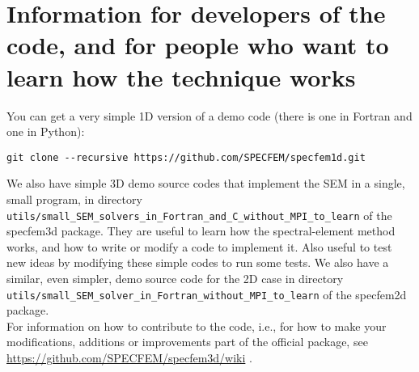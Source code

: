 
\chapter{Information for developers of the code, and for people who want to learn how the technique works}\label{cha:developers}


You can get a very simple 1D version of a demo code (there is one in Fortran and one in Python):
\begin{verbatim}
git clone --recursive https://github.com/SPECFEM/specfem1d.git
\end{verbatim}

\noindent We also have simple 3D demo source codes that implement the SEM in a single, small program, in directory\\
\texttt{utils/small\_SEM\_solvers\_in\_Fortran\_and\_C\_without\_MPI\_to\_learn} of the specfem3d package.
They are useful to learn how the spectral-element method works, and how to write or modify a code to implement it.
Also useful to test new ideas by modifying these simple codes to run some tests.
We also have a similar, even simpler, demo source code for the 2D case in directory\\
\texttt{utils/small\_SEM\_solver\_in\_Fortran\_without\_MPI\_to\_learn} of the specfem2d package.\\

\noindent For information on how to contribute to the code, i.e., for how to make your modifications, additions or improvements part of the
official package, see \url{https://github.com/SPECFEM/specfem3d/wiki} .

